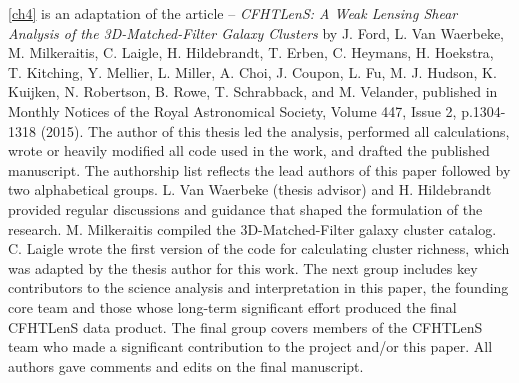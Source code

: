 \autoref{ch4} is an adaptation of the article -- {\it CFHTLenS: A Weak Lensing Shear Analysis of the 3D-Matched-Filter Galaxy Clusters} by J. Ford, L. Van Waerbeke, M. Milkeraitis, C. Laigle, H. Hildebrandt, T. Erben, C. Heymans, H. Hoekstra, T. Kitching, Y. Mellier, L. Miller, A. Choi, J. Coupon, L. Fu, M. J. Hudson, K. Kuijken, N. Robertson, B. Rowe, T. Schrabback, and M. Velander, published in Monthly Notices of the Royal Astronomical Society, Volume 447, Issue 2, p.1304-1318 (2015). The author of this thesis led the analysis, performed all calculations, wrote or heavily modified all code used in the work, and drafted the published manuscript. The authorship list reflects the lead authors of this paper followed by two alphabetical groups. L. Van Waerbeke (thesis advisor) and H. Hildebrandt provided regular discussions and guidance that shaped the formulation of the research. M. Milkeraitis compiled the 3D-Matched-Filter galaxy cluster catalog. C. Laigle wrote the first version of the code for calculating cluster richness, which was adapted by the thesis author for this work. The next group includes key contributors to the science analysis and interpretation in this paper, the founding core team and those whose long-term significant effort produced the final \acs{CFHTLenS} data product. The final group covers members of the \acs{CFHTLenS} team who made a significant contribution to the project and/or this paper. All authors gave comments and edits on the final manuscript.

